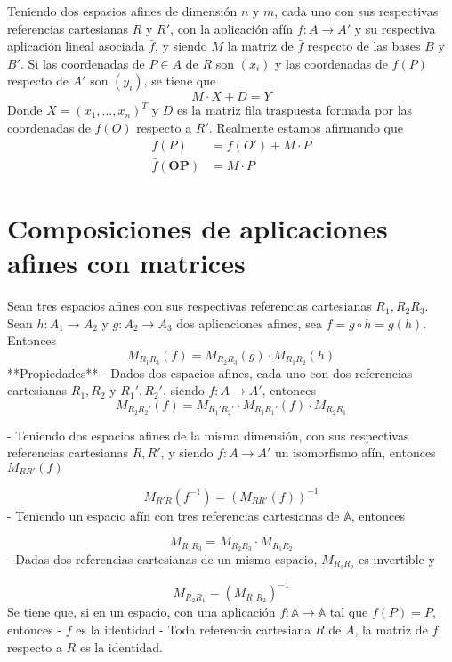 \documentclass{./Geometria.tex}
\begin{document}
Teniendo dos espacios afines de dimensión $n$ y $m$, cada uno con sus respectivas referencias cartesianas $R$ y $R'$, con la aplicación afín $f:A\to A'$ y su respectiva aplicación lineal asociada $\bar{f}$, y siendo $M$ la matriz de $\bar{f}$ respecto de las bases $B$ y $B'$.
Si las coordenadas de $P\in A$ de $R$ son $(x_{i})$ y las coordenadas de $f(P)$ respecto de $A'$ son $(y_{i})$, se tiene que
$$
M\cdot X+D=Y
$$
Donde $X=(x_{1},\dots,x_{n})^{T}$ y $D$ es la matriz fila traspuesta formada por las coordenadas de $f(O)$ respecto a $R'$.
Realmente estamos afirmando que
\begin{equation}
	\begin{split}
		f(P)&=f(O')+M\cdot P\\
		\bar{f}(\mathbf{OP})&=M\cdot P
	\end{split}
\end{equation}
\section{Composiciones de aplicaciones afines con matrices}
Sean tres espacios afines con sus respectivas referencias cartesianas $R_{1},R_{2}R_{3}$. Sean $h:A_{1}\to A_{2}$ y $g:A_{2}\to A_{3}$ dos aplicaciones afines, sea $f=g\circ h =g(h)$. Entonces
$$
M_{R_{1}R_{3}}(f)=M_{R_{2}R_{3}}(g)\cdot M_{R_{1}R_{2}}(h)
$$
**Propiedades**
- Dados dos espacios afines, cada uno con dos referencias cartesianas $R_{1},R_{2}$ y $R_{1}',R_{2}'$, siendo $f:A\to A'$, entonces
   $$
M_{R_{2}R_{2}'}(f)=M_{R_{1}'R_{2}'}\cdot M_{R_{1}R_{1}'}(f)\cdot M_{R_{2}R_{1}}
$$

- Teniendo dos espacios afines de la misma dimensión, con sus respectivas referencias cartesianas $R,R'$, y siendo $f:A\to A'$ un isomorfismo afín, entonces $M_{R R'}(f)$

$$
M_{R'R}(f^{-1})=(M_{R R'}(f))^{-1}
$$
- Teniendo un espacio afín con tres referencias cartesianas de $\mathbb{A}$, entonces

$$
M_{R_{1}R_{3}}=M_{R_{2}R_{3}}\cdot M_{R_{1}R_{2}}
$$
- Dadas dos referencias cartesianas de un mismo espacio, $M_{R_{1}R_{2}}$ es invertible y

$$
M_{R_{2}R_{1}}=(M_{R_{1}R_{2}})^{-1}
$$
Se tiene que, si en un espacio, con una aplicación $f:\mathbb{A}\to \mathbb{A}$ tal que $f(P)=P$, entonces
- $f$ es la identidad
- Toda referencia cartesiana $R$ de $A$, la matriz de $f$ respecto a $R$ es la identidad.
\end{document}
